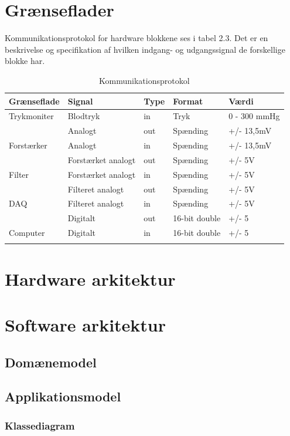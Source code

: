 \section{Grænseflader}
Kommunikationsprotokol for hardware blokkene ses i tabel 2.3. Det er en beskrivelse og specifikation af hvilken indgang- og udgangssignal de forskellige blokke har.   

\begin{longtabu} to 
	\textbf{Grænseflade} & \textbf{Signal} & \textbf{Type} & \textbf{Format} & \textbf{Værdi} \\[-1ex]
	\midrule
	Trykmoniter & Blodtryk & in & Tryk & 0 - 300 mmHg \\[-1ex]
				& Analogt & out & Spænding & +/- 13,5mV \\[-1ex]
	Forstærker  & Analogt & in & Spænding & +/- 13,5mV \\[-1ex]
				& Forstærket analogt & out & Spænding & +/- 5V \\[-1ex]
	Filter 		& Forstærket analogt & in & Spænding & +/- 5V \\				[-1ex]
				& Filteret analogt & out & Spænding & +/- 5V \\[-1ex]
	DAQ			& Filteret analogt & in & Spænding & +/- 5V \\				[-1ex]	
				& Digitalt & out & 16-bit double & +/- 5 \\[-1ex]
	Computer	& Digitalt & in & 16-bit double & +/- 5 \\[-1ex]
	\caption{Kommunikationsprotokol}	
\end{longtabu}


\section{Hardware arkitektur}


\section{Software arkitektur}

\subsection{Domænemodel}

\subsection{Applikationsmodel}
\subsubsection{Klassediagram}

